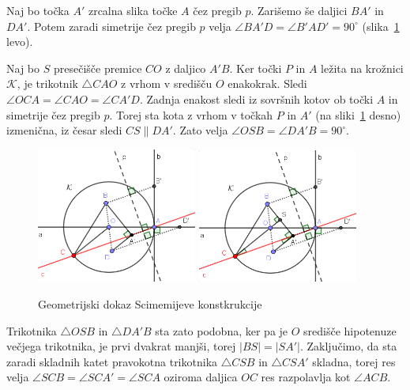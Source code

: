 \begin{dokaz}
    Naj bo točka $A'$ zrcalna slika točke $A$ čez pregib $p$. Zarišemo še daljici $BA'$ in $DA'$. Potem zaradi simetrije čez pregib $p$ velja $\angle BA'D = \angle B'AD' = 90^\circ$ (slika~\ref{fig:scimemi_dokaz} levo).

    Naj bo $S$ presečišče premice $CO$ z daljico $A'B$. Ker točki $P$ in $A$ ležita na krožnici $\mathcal{K}$, je trikotnik $\triangle CAO$ z vrhom v središču $O$ enakokrak. Sledi $\angle OCA = \angle CAO = \angle CA'D$. Zadnja enakost sledi iz sovršnih kotov ob točki $A$ in simetrije čez pregib $p$. Torej sta kota z vrhom v točkah $P$ in $A'$ (na sliki~\ref{fig:scimemi_dokaz} desno) izmenična, iz česar sledi $CS \parallel DA'$. Zato velja $\angle OSB = \angle DA'B = 90^\circ$.

    \begin{figure}[h]
        \centering
        \includegraphics[width=0.47\textwidth]{images/alhazen/scimemi_dokaz1.png}
        \includegraphics[width=0.47\textwidth]{images/alhazen/scimemi_dokaz2.png}
        \caption[Dokaz Scimemijeve konstrukcije]{Geometrijski dokaz Scimemijeve konstkrukcije}
        \label{fig:scimemi_dokaz}
    \end{figure}

    Trikotnika $\triangle OSB$ in $\triangle DA'B$ sta zato podobna, ker pa je $O$ središče hipotenuze večjega trikotnika, je prvi dvakrat manjši, torej $|BS| = |SA'|$. Zaključimo, da sta zaradi skladnih katet pravokotna trikotnika $\triangle CSB$ in $\triangle CSA'$ skladna, torej res velja $\angle SCB = \angle SCA' = \angle SCA$ oziroma daljica $OC$ res razpolavlja kot $\angle ACB$.
\end{dokaz}

